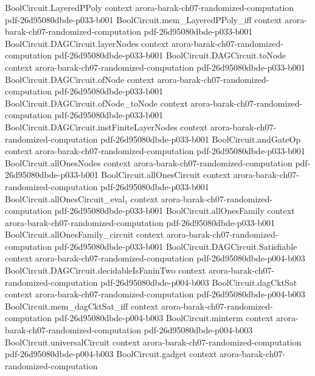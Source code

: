 \begin{theorem}
\proofstep
  {BoolCircuit.LayeredPPoly}
  {context}
  {arora-barak-ch07-randomized-computation}
  {pdf-26d95080dbde-p033-b001}
\proofstep
  {BoolCircuit.mem_LayeredPPoly_iff}
  {context}
  {arora-barak-ch07-randomized-computation}
  {pdf-26d95080dbde-p033-b001}
\proofstep
  {BoolCircuit.DAGCircuit.layerNodes}
  {context}
  {arora-barak-ch07-randomized-computation}
  {pdf-26d95080dbde-p033-b001}
\proofstep
  {BoolCircuit.DAGCircuit.toNode}
  {context}
  {arora-barak-ch07-randomized-computation}
  {pdf-26d95080dbde-p033-b001}
\proofstep
  {BoolCircuit.DAGCircuit.ofNode}
  {context}
  {arora-barak-ch07-randomized-computation}
  {pdf-26d95080dbde-p033-b001}
\proofstep
  {BoolCircuit.DAGCircuit.ofNode_toNode}
  {context}
  {arora-barak-ch07-randomized-computation}
  {pdf-26d95080dbde-p033-b001}
\proofstep
  {BoolCircuit.DAGCircuit.instFiniteLayerNodes}
  {context}
  {arora-barak-ch07-randomized-computation}
  {pdf-26d95080dbde-p033-b001}
\proofstep
  {BoolCircuit.andGateOp}
  {context}
  {arora-barak-ch07-randomized-computation}
  {pdf-26d95080dbde-p033-b001}
\proofstep
  {BoolCircuit.allOnesNodes}
  {context}
  {arora-barak-ch07-randomized-computation}
  {pdf-26d95080dbde-p033-b001}
\proofstep
  {BoolCircuit.allOnesCircuit}
  {context}
  {arora-barak-ch07-randomized-computation}
  {pdf-26d95080dbde-p033-b001}
\proofstep
  {BoolCircuit.allOnesCircuit_eval₁}
  {context}
  {arora-barak-ch07-randomized-computation}
  {pdf-26d95080dbde-p033-b001}
\proofstep
  {BoolCircuit.allOnesFamily}
  {context}
  {arora-barak-ch07-randomized-computation}
  {pdf-26d95080dbde-p033-b001}
\proofstep
  {BoolCircuit.allOnesFamily_circuit}
  {context}
  {arora-barak-ch07-randomized-computation}
  {pdf-26d95080dbde-p033-b001}
\proofstep
  {BoolCircuit.DAGCircuit.Satisfiable}
  {context}
  {arora-barak-ch07-randomized-computation}
  {pdf-26d95080dbde-p004-b003}
\proofstep
  {BoolCircuit.DAGCircuit.decidableIsFaninTwo}
  {context}
  {arora-barak-ch07-randomized-computation}
  {pdf-26d95080dbde-p004-b003}
\proofstep
  {BoolCircuit.dagCktSat}
  {context}
  {arora-barak-ch07-randomized-computation}
  {pdf-26d95080dbde-p004-b003}
\proofstep
  {BoolCircuit.mem_dagCktSat_iff}
  {context}
  {arora-barak-ch07-randomized-computation}
  {pdf-26d95080dbde-p004-b003}
\proofstep
  {BoolCircuit.minterm}
  {context}
  {arora-barak-ch07-randomized-computation}
  {pdf-26d95080dbde-p004-b003}
\proofstep
  {BoolCircuit.universalCircuit}
  {context}
  {arora-barak-ch07-randomized-computation}
  {pdf-26d95080dbde-p004-b003}
\proofstep
  {BoolCircuit.gadget}
  {context}
  {arora-barak-ch07-randomized-computation}

\end{theorem}
